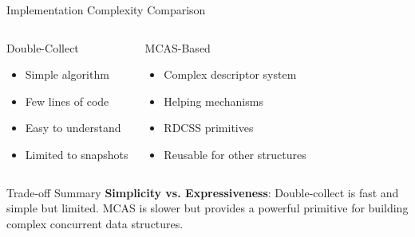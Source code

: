 \documentclass[aspectratio=169]{beamer}
\begin{document}
\begin{frame}{Implementation Complexity Comparison}
    \begin{columns}[c]
        \begin{block}{Double-Collect}
            \begin{itemize}
                \item Simple algorithm
                \item Few lines of code
                \item Easy to understand
                \item Limited to snapshots
            \end{itemize}
        \end{block}

        \begin{block}{MCAS-Based}
            \begin{itemize}
                \item Complex descriptor system
                \item Helping mechanisms
                \item RDCSS primitives
                \item Reusable for other structures
            \end{itemize}
        \end{block}
    \end{columns}

    \vspace{0.3cm}
    \begin{block}{Trade-off Summary}
        \textbf{Simplicity vs. Expressiveness}: Double-collect is fast and simple but limited. MCAS is slower but provides a powerful primitive for building complex concurrent data structures.
    \end{block}
\end{frame}
\end{document}
